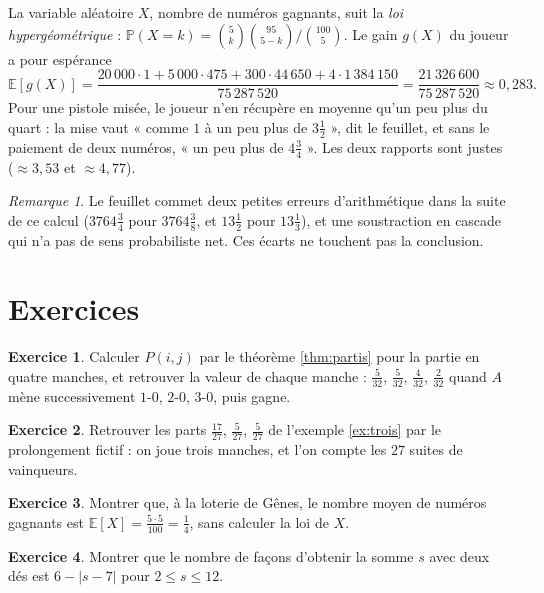 \documentclass[11pt,a4paper]{article}
\theoremstyle{plain}
\theoremstyle{definition}
\newtheorem{exercice}{Exercice}
\theoremstyle{remark}
\newtheorem{remarque}[theoreme]{Remarque}
\newcommand{\Prob}{\mathbb{P}}
\newcommand{\E}{\mathbb{E}}
\begin{document}
La variable aléatoire $X$, nombre de numéros gagnants, suit la \emph{loi hypergéométrique} : $\Prob(X=k)=\binom5k\binom{95}{5-k}\big/\binom{100}5$. Le gain $g(X)$ du joueur a pour espérance
\[
  \E[g(X)]=\frac{20\,000\cdot1+5\,000\cdot475+300\cdot44\,650+4\cdot1\,384\,150}{75\,287\,520}=\frac{21\,326\,600}{75\,287\,520}\approx0{,}283 .
\]
Pour une pistole misée, le joueur n'en récupère en moyenne qu'un peu plus du quart : la mise vaut « comme $1$ à un peu plus de $3\frac12$ », dit le feuillet, et sans le paiement de deux numéros, « un peu plus de $4\frac34$ ». Les deux rapports sont justes ($\approx3{,}53$ et $\approx4{,}77$).

\begin{remarque}
Le feuillet commet deux petites erreurs d'arithmétique dans la suite de ce calcul ($3764\frac34$ pour $3764\frac38$, et $13\frac12$ pour $13\frac13$), et une soustraction en cascade qui n'a pas de sens probabiliste net. Ces écarts ne touchent pas la conclusion.
\end{remarque}

\section{Exercices}

\begin{exercice}\label{exo:valeurs}
Calculer $P(i,j)$ par le théorème \ref{thm:partis} pour la partie en quatre manches, et retrouver la valeur de chaque manche : $\frac5{32}$, $\frac5{32}$, $\frac4{32}$, $\frac2{32}$ quand $A$ mène successivement $1$-$0$, $2$-$0$, $3$-$0$, puis gagne.
\end{exercice}

\begin{exercice}\label{exo:trois}
Retrouver les parts $\frac{17}{27}$, $\frac5{27}$, $\frac5{27}$ de l'exemple \ref{ex:trois} par le prolongement fictif : on joue trois manches, et l'on compte les $27$ suites de vainqueurs.
\end{exercice}

\begin{exercice}\label{exo:esperance}
Montrer que, à la loterie de Gênes, le nombre moyen de numéros gagnants est $\E[X]=\frac{5\cdot5}{100}=\frac14$, sans calculer la loi de $X$.
\end{exercice}

\begin{exercice}\label{exo:somme}
Montrer que le nombre de façons d'obtenir la somme $s$ avec deux dés est $6-|s-7|$ pour $2\leq s\leq12$.
\end{exercice}
\end{document}
